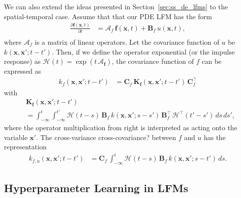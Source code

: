 \documentclass[journal]{IEEEtran}
\newcommand{\mauricio}[1]{{\color{blue}#1}}
\begin{document}
We can also extend the ideas presented in Section~\ref{sec:ss_de_lfms} to the spatial-temporal case.  Assume that that our PDE LFM has the form
%
\begin{equation}
\begin{split}
  \frac{\partial \mathbf{f}(\mathbf{x},t)}{\partial t}
  &= \mathbf{\mathcal{A}}_f \, \mathbf{f}(\mathbf{x},t) + \mathbf{B}_f \, u(\mathbf{x},t), \\
\end{split}
\end{equation}
%
where $\mathbf{\mathcal{A}}_f$ is a matrix of linear operators. Let the covariance function of $u$ be $k(\mathbf{x},\mathbf{x}';t - t')$. Then, if we define the operator exponential (or the impulse response) as $\mathbf{\mathcal{H}}(t) = \exp(t \, \mathbf{\mathcal{A}_f})$, the covariance function of $f$ can be expressed as
%
\begin{equation}
\begin{split}
  k_f(\mathbf{x},\mathbf{x}';t-t') &=
  \mathbf{C}_f \, \mathbf{K}_\mathbf{f}(\mathbf{x},\mathbf{x}';t-t') \, \mathbf{C}_f^{\top}
\end{split}
\end{equation}
%
with
%
\begin{equation}
\begin{split}
  &\mathbf{K}_\mathbf{f}(\mathbf{x},\mathbf{x}';t-t')
  \\ &
  =
  \int_{-\infty}^{t} \int_{-\infty}^{t'}
  \mathbf{\mathcal{H}}(t - s) \, \mathbf{B}_f \, k(\mathbf{x},\mathbf{x}';s - s') \,
  \mathbf{B}_f^{\top} \, \mathbf{\mathcal{H}}^{\top}(t' - s') \, ds \, ds',
\end{split}
\label{eq:vfcov_pde}
\end{equation}
%
where the operator multiplication from right is interpreted as acting onto the variable $\mathbf{x}'$. The
\mauricio{cross-variance cross-covariance?} between $f$ and $u$ has the representation
%
\begin{equation}
\begin{split}
  k_{f,u}(\mathbf{x},\mathbf{x}';t-t') &=
  \mathbf{C}_f \, 
  \int_{-\infty}^{t}
  \mathbf{\mathcal{H}}(t - s) \, \mathbf{B}_f \, k(\mathbf{x},\mathbf{x}';s - t') \, ds.
\end{split}
\end{equation}

\subsection{Hyperparameter Learning in LFMs}
\end{document}
